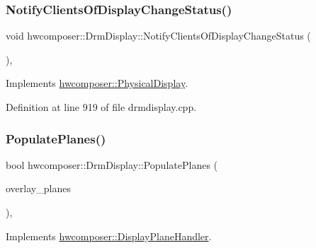 \subsubsection{\texorpdfstring{Notify\+Clients\+Of\+Display\+Change\+Status()}{NotifyClientsOfDisplayChangeStatus()}}
{\footnotesize\ttfamily void hwcomposer\+::\+Drm\+Display\+::\+Notify\+Clients\+Of\+Display\+Change\+Status (\begin{DoxyParamCaption}{ }\end{DoxyParamCaption})\hspace{0.3cm}{\ttfamily [override]}, {\ttfamily [virtual]}}



Implements \mbox{\hyperlink{classhwcomposer_1_1PhysicalDisplay_aefba7f9543d7ef74d42f9e06dd0f1a58}{hwcomposer\+::\+Physical\+Display}}.



Definition at line 919 of file drmdisplay.\+cpp.


\begin{DoxyCode}{0}
\end{DoxyCode}
\mbox{\label{classhwcomposer_1_1DrmDisplay_acbf817afffc6ad6f2879d914a0335dd0}} 
\subsubsection{\texorpdfstring{Populate\+Planes()}{PopulatePlanes()}}
{\footnotesize\ttfamily bool hwcomposer\+::\+Drm\+Display\+::\+Populate\+Planes (\begin{DoxyParamCaption}\item[{std\+::vector$<$ std\+::unique\+\_\+ptr$<$ \mbox{\hyperlink{classhwcomposer_1_1DisplayPlane}{Display\+Plane}} $>$$>$ \&}]{overlay\+\_\+planes }\end{DoxyParamCaption})\hspace{0.3cm}{\ttfamily [override]}, {\ttfamily [virtual]}}



Implements \mbox{\hyperlink{classhwcomposer_1_1DisplayPlaneHandler_aa4d32269c693dbf4a4c91c31ed577784}{hwcomposer\+::\+Display\+Plane\+Handler}}.



